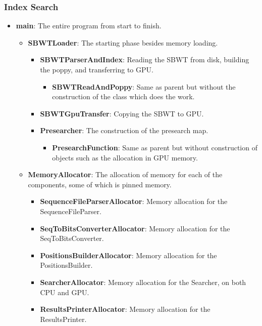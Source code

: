 \subsubsection{Index Search}\label{app:IndexTableDescriptions}

\begin{itemize}
  \item \textbf{main}: The entire program from start to finish.
  \begin{itemize}
    \item \textbf{SBWTLoader}: The starting phase besides memory loading.
    \begin{itemize}
      \item \textbf{SBWTParserAndIndex}: Reading the SBWT from disk, building the poppy, and transferring to GPU.
      \begin{itemize}
        \item \textbf{SBWTReadAndPoppy}: Same as parent but without the construction of the class which does the work.
      \end{itemize}
      \item \textbf{SBWTGpuTransfer}: Copying the SBWT to GPU.
      \item \textbf{Presearcher}: The construction of the presearch map.
      \begin{itemize}
        \item \textbf{PresearchFunction}: Same as parent but without construction of objects such as the allocation in GPU memory.
      \end{itemize}
    \end{itemize}
    \item \textbf{MemoryAllocator}: The allocation of memory for each of the components, some of which is pinned memory.
    \begin{itemize}
      \item \textbf{SequenceFileParserAllocator}: Memory allocation for the SequenceFileParser.
      \item \textbf{SeqToBitsConverterAllocator}: Memory allocation for the SeqToBitsConverter.
      \item \textbf{PositionsBuilderAllocator}: Memory allocation for the PositionsBuilder.
      \item \textbf{SearcherAllocator}: Memory allocation for the Searcher, on both CPU and GPU.
      \item \textbf{ResultsPrinterAllocator}: Memory allocation for the ResultsPrinter.
    \end{itemize}

\end{itemize}
\end{itemize}
